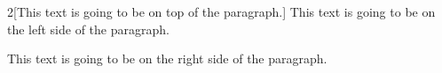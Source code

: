 
\begin{multicols}{2}[This text is going to be on top of the paragraph.]
	This text is going to be on the left side of the paragraph.

	\columnbreak

	This text is going to be on the right side of the paragraph.
\end{multicols}
